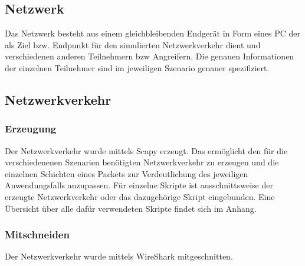 \subsection{Netzwerk}
Das Netzwerk besteht aus einem gleichbleibenden Endgerät in Form eines PC der als Ziel bzw. Endpunkt für den simulierten Netzwerkverkehr dient und verschiedenen anderen Teilnehmern bzw Angreifern. Die genauen Informationen der einzelnen Teilnehmer sind im jeweiligen Szenario genauer spezifiziert.
\subsection{Netzwerkverkehr}
\subsubsection{Erzeugung}
Der Netzwerkverkehr wurde mittels Scapy erzeugt. Das ermöglicht den für die verschiedenenen Szenarien benötigten Netzwerkverkehr zu erzeugen und die einzelnen Schichten eines Packets zur Verdeutlichung des jeweiligen Anwendungsfalls anzupassen. Für einzelne Skripte ist ausschnittsweise der erzeugte Netzwerkverkehr oder das dazugehörige Skript eingebunden. Eine Übersicht über alle dafür verwendeten Skripte findet sich im Anhang.
\subsubsection{Mitschneiden}
Der Netzwerkverkehr wurde mittels WireShark mitgeschnitten.
